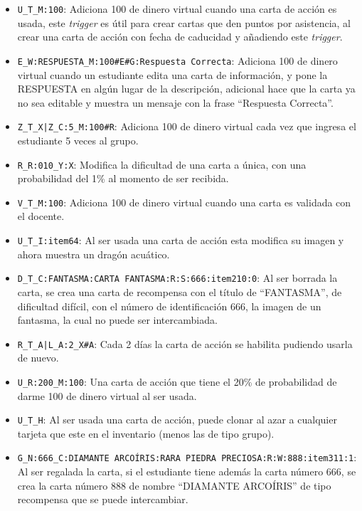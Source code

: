 \begin{itemize}
	\item {\Large\color{blue} \verb/U_T_M:100/}: Adiciona 100 de dinero virtual cuando una carta de acción 
		es usada, este \textit{trigger} es útil para crear cartas que den puntos por asistencia, al 
		crear una carta de acción con fecha de caducidad y añadiendo este \textit{trigger}.
	\item {\Large\color{blue} \verb/E_W:RESPUESTA_M:100#E#G:Respuesta Correcta/}: Adiciona 100 de dinero 
		virtual cuando un estudiante edita una carta de información, y pone la RESPUESTA en algún 
		lugar de la descripción, adicional hace que la carta ya no sea editable y muestra un mensaje 
		con la frase ``Respuesta Correcta''.
	\item {\Large\color{blue} \verb/Z_T_X|Z_C:5_M:100#R/}: Adiciona 100 de dinero virtual cada vez que 
		ingresa el estudiante 5 veces al grupo.
	\item {\Large\color{blue} \verb/R_R:010_Y:X/}: Modifica la dificultad de una carta a única, con una
		probabilidad del 1\% al momento de ser recibida.
	\item {\Large\color{blue} \verb/V_T_M:100/}: Adiciona 100 de dinero virtual cuando una carta es 
		validada con el docente.
	\item {\Large\color{blue} \verb/U_T_I:item64/}: Al ser usada una carta de acción esta modifica su 
		imagen y ahora muestra un dragón acuático.
	\item {\Large\color{blue} \verb/D_T_C:FANTASMA:CARTA FANTASMA:R:S:666:item210:0/}: Al ser borrada la
		carta, se crea una carta de recompensa con el título de ``FANTASMA'', de dificultad difícil, 
		con el número de identificación 666, la imagen de un fantasma, la cual no puede ser 
		intercambiada.
	\item {\Large\color{blue} \verb/R_T_A|L_A:2_X#A/}: Cada 2 días la carta de acción se habilita 
		pudiendo usarla de nuevo.
	\item {\Large\color{blue} \verb/U_R:200_M:100/}: Una carta de acción que tiene el 20\% de probabilidad 
		de darme 100 de dinero virtual al ser usada.
	\item {\Large\color{blue} \verb/U_T_H/}: Al ser usada una carta de acción, puede clonar al azar a 
		cualquier tarjeta que este en el inventario (menos las de tipo grupo).
	\item {\normalsize\color{blue} \verb/G_N:666_C:DIAMANTE ARCOÍRIS:RARA PIEDRA PRECIOSA:R:W:888:item311:1/}: 
		Al ser regalada la carta, si el estudiante tiene además la carta número 666, se crea la carta
		número 888 de nombre ``DIAMANTE ARCOÍRIS'' de tipo recompensa que se puede intercambiar.
\end{itemize}

